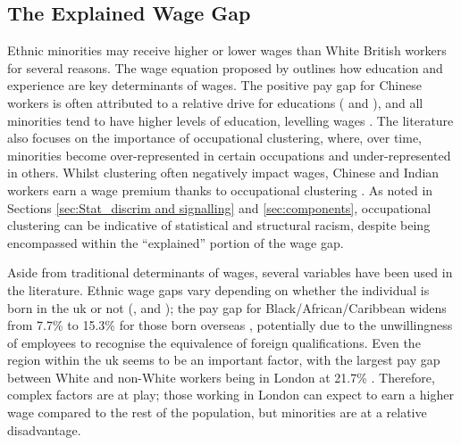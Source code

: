 \documentclass[class=article, crop=false]{standalone}
\begin{document}
\subsection{The Explained Wage Gap}
Ethnic minorities may receive higher or lower wages than White British workers for several reasons. The wage equation proposed by \citet{MincerA} outlines how education and experience are key determinants of wages. The positive pay gap for Chinese workers is often attributed to a relative drive for educations (\citet{Leslie} and \citet{Berthoud}), and all minorities tend to have higher levels of education, levelling wages \citep{Longhi2}. The literature also focuses on the importance of occupational clustering, where, over time, minorities become over-represented in certain occupations and under-represented in others. Whilst clustering often negatively impact wages, Chinese and Indian workers earn a wage premium thanks to occupational clustering \citep{Brynin}. As noted in Sections \ref{sec:Stat_discrim and signalling} and \ref{sec:components}, occupational clustering can be indicative of statistical and structural racism, despite being encompassed within the \enquote{explained} portion of the wage gap.

Aside from traditional determinants of wages, several variables have been used in the literature. Ethnic wage gaps vary depending on whether the individual is born in the \acrshort{uk} or not (\citet{Brynin}, \citet{ONSe} and \citet{Shields}); the pay gap for Black/African/Caribbean widens from 7.7\% to 15.3\% for those born overseas \citep{ONSe}, potentially due to the unwillingness of employees to recognise the equivalence of foreign qualifications. Even the region within the \acrshort{uk} seems to be an important factor, with the largest pay gap between White and non-White workers being in London at 21.7\% \citep{ONSe}. Therefore, complex factors are at play; those working in London can expect to earn a higher wage compared to the rest of the population, but minorities are at a relative disadvantage.

\end{document}
